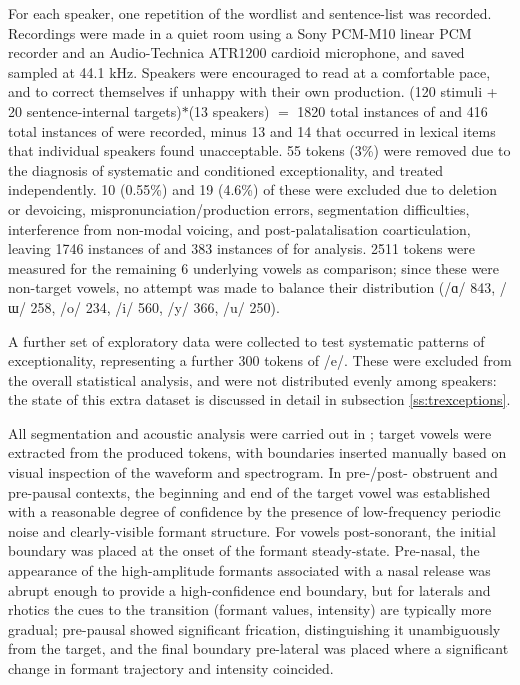 For each speaker, one repetition of the wordlist and sentence-list was recorded. Recordings were made in a quiet room using a Sony PCM-M10 linear PCM recorder and an Audio-Technica ATR1200 cardioid microphone, and saved sampled at 44.1 kHz. Speakers were encouraged to read at a comfortable pace, and to correct themselves if unhappy with their own production. (120 stimuli + 20 sentence-internal targets)$*$(13 speakers) $=$ 1820 total instances of  and 416 total instances of \ur{\o} were recorded, minus 13 \ur{\o} and 14  that occurred in lexical items that individual speakers found unacceptable. 55  tokens (3\%) were removed due to the diagnosis of systematic and conditioned exceptionality, and treated independently. 10  (0.55\%) and 19 \ur{\o} (4.6\%) of these were excluded due to deletion or devoicing, mispronunciation/production errors, segmentation difficulties, interference from non-modal voicing, and post-palatalisation coarticulation, leaving 1746 instances of  and 383 instances of \ur{\o} for analysis. 2511 tokens were measured for the remaining 6 underlying vowels as comparison; since these were non-target vowels, no attempt was made to balance their distribution (/ɑ/ 843, /ɯ/ 258, /o/ 234, /i/ 560, /y/ 366, /u/ 250).

A further set of exploratory data were collected to test systematic patterns of exceptionality, representing a further 300 tokens of /e/. These were excluded from the overall statistical analysis, and were not distributed evenly among speakers: the state of this extra dataset is discussed in detail in subsection \ref{ss:trexceptions}.

All segmentation and acoustic analysis were carried out in  \citep{Praat}; target vowels were extracted from the produced tokens, with boundaries inserted manually based on visual inspection of the waveform and spectrogram. In pre-/post- obstruent and pre-pausal contexts, the beginning and end of the target vowel was established with a reasonable degree of confidence by the presence of low-frequency periodic noise and clearly-visible formant structure. For vowels post-sonorant, the initial boundary was placed at the onset of the formant steady-state. Pre-nasal, the appearance of the high-amplitude formants associated with a nasal release was abrupt enough to provide a high-confidence end boundary, but for laterals and rhotics the cues to the transition (formant values, intensity) are typically more gradual; pre-pausal  showed significant frication, distinguishing it unambiguously from the target, and the final boundary pre-lateral was placed where a significant change in formant trajectory and intensity coincided.

